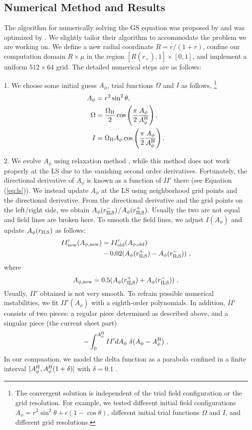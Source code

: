 \documentclass[iop,apj]{emulateapj}
\def\be{\begin{equation}}
\def\ee{\end{equation}}
\def\WH{\Omega_{\rm H}}
\def\AB{A_\phi^{\rm H}}
\begin{document}
\subsection{Numerical Method and Results}
The algorithm for numerically solving the GS equation was proposed by
\citet{Contopoulos2013} and was optimized by \citet{Nathanail2014}.
We slightly tailor their algorithm to accommodate the problem we are working on.
We define a new radial coordinate $R = r/(1+r)$, confine our computation domain
$R\times \mu$ in the region  $[R(r_+), 1]\times [0,1]$,
and implement a uniform $512\times 64$ grid.
The detailed numerical steps are as follows:

1. We choose some initial guess $A_\phi$, trial functions $\Omega$ and $I$ as follows,
\footnote{The convergent solution is independent of the trial field configuration or the grid resolution.
For example, we tested different initial field configurations $A_\phi = r^2\sin^2\theta  +\epsilon (1-\cos\theta)$,
different initial trial functions $\Omega$ and $I$, and different grid resolutions.}
\be
\begin{aligned}
    A_\phi &= r^2\sin^2\theta, \\
    \Omega &= \frac{\WH}{2}\cos\left(\frac{\pi}{2}\frac{A_\phi}{\AB}\right),\\
    I &= \WH A_\phi\cos\left(\frac{\pi}{2}\frac{A_\phi}{\AB}\right).
\end{aligned}
\ee

2. We evolve $A_\phi$ using relaxation method \citep{Press1987},
while this method does not work properly at the LS due to the vanishing second order derivatives.
Fortunately, the directional derivative of $A_\phi$ is known as a function of $II'$ there (see Equation (\ref{eq:ls})).
We instead update $A_\phi$ at the LS using neighborhood grid points and the directional derivative.
From the directional derivative and the grid points on the left/right side,
we obtain $A_\phi(r_{\rm ILS}^-)$/$A_\phi(r_{\rm ILS}^+)$.
Usually the two are not equal and field lines are broken here. To smooth the field lines,
we adjust $I(A_\phi)$ and update $A_\phi(r_{\rm ILS})$ as follows:
\be
\begin{aligned}
    II'_{\rm new}(A_{\phi, \rm new}) &= II'_{\rm old}(A_{\phi, \rm old}) \\
    &- 0.02(A_\phi(r_{\rm ILS}^+) - A_\phi(r_{\rm ILS}^-)) \ ,
\end{aligned}
\ee
where
\be
    A_{\phi, \rm new} = 0.5(A_\phi(r_{\rm ILS}^+) + A_\phi(r_{\rm ILS}^-)) \ .
\ee
Usually, $II'$ obtained is not very smooth.
To refrain possible numerical instabilities, we fit $II'(A_\phi)$ with a eighth-order polynomials.
In addition, $II'$ consists of two pieces: a regular piece determined as described above,
and a singular piece (the current sheet part)
\be
-\int_0^{\AB} II' dA_\phi \ \delta(A_\phi-\AB) \ .
\ee
In our compuation, we model the delta function as a parabola confined in
a finite interval $[\AB, \AB (1+\delta)]$ with $\delta = 0.1$ \citep[see e.g.][]{Gruzinov2005}.
\end{document}
